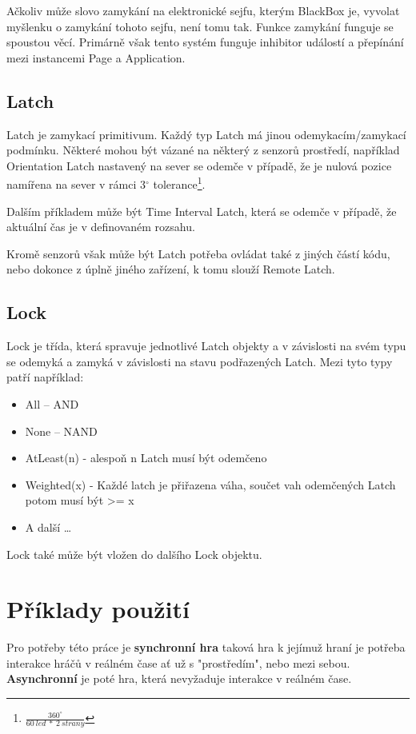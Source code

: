 Ačkoliv může slovo zamykání na elektronické sejfu, kterým BlackBox je, vyvolat myšlenku o zamykání tohoto sejfu, není tomu tak.
Funkce zamykání funguje se spoustou věcí.
Primárně však tento systém funguje inhibitor událostí a přepínání mezi instancemi Page a Application.

\subsection{Latch}
Latch je zamykací primitivum.
Každý typ Latch má jinou odemykacím/zamykací podmínku.
Některé mohou být vázané na některý z senzorů prostředí, například Orientation Latch nastavený na sever se odemče v případě, že je nulová pozice namířena na sever v rámci 3$^{\circ}$ tolerance\footnote{$\frac{360^{\circ}}{60~led~*~2~strany}$}.

Dalším příkladem může být Time Interval Latch, která se odemče v případě, že aktuální čas je v definovaném rozsahu.

Kromě senzorů však může být Latch potřeba ovládat také z jiných částí kódu, nebo dokonce z úplně jiného zařízení, k tomu slouží Remote Latch.

\subsection{Lock}

Lock je třída, která spravuje jednotlivé Latch objekty a v závislosti na svém typu se odemyká a zamyká v závislosti na stavu podřazených Latch.
Mezi tyto typy patří například:
\begin{itemize}
    \item All -- AND
    \item None -- NAND
    \item AtLeast(n) - alespoň n Latch musí být odemčeno
    \item Weighted(x) - Každé latch je přiřazena váha, součet vah odemčených Latch potom musí být >= x
    \item A další \dots
\end{itemize}
Lock také může být vložen do dalšího Lock objektu.

\section{Příklady použití}

Pro potřeby této práce je \textbf{synchronní hra} taková hra k jejímuž hraní je potřeba interakce hráčů v reálném čase ať už s "prostředím", nebo mezi sebou.
\textbf{Asynchronní} je poté hra, která nevyžaduje interakce v reálném čase.

